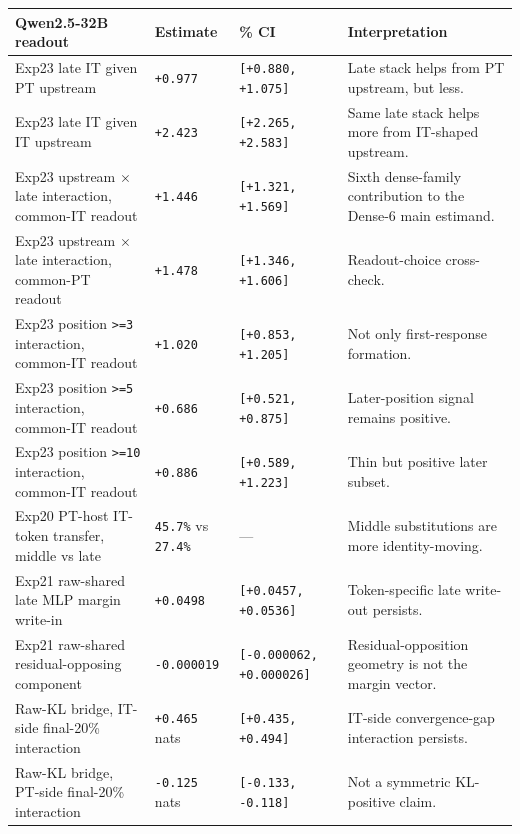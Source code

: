 \documentclass[11pt]{article}
\begin{document}
\begin{table}[t]
\centering
\small
\setlength{\tabcolsep}{3pt}
\begin{tabularx}{\linewidth}{@{}>{\raggedright\arraybackslash}X >{\raggedright\arraybackslash}X >{\raggedright\arraybackslash}X >{\raggedright\arraybackslash}X@{}}
\toprule
Qwen2.5-32B readout & Estimate & 95\% CI & Interpretation \\
\midrule
Exp23 late IT given PT upstream & \texttt{+0.977} & \texttt{[+0.880, +1.075]} & Late stack helps from PT upstream, but less. \\
Exp23 late IT given IT upstream & \texttt{+2.423} & \texttt{[+2.265, +2.583]} & Same late stack helps more from IT-shaped upstream. \\
Exp23 upstream \ensuremath{\times} late interaction, common-IT readout & \texttt{+1.446} & \texttt{[+1.321, +1.569]} & Sixth dense-family contribution to the Dense-6 main estimand. \\
Exp23 upstream \ensuremath{\times} late interaction, common-PT readout & \texttt{+1.478} & \texttt{[+1.346, +1.606]} & Readout-choice cross-check. \\
Exp23 position \texttt{>=3} interaction, common-IT readout & \texttt{+1.020} & \texttt{[+0.853, +1.205]} & Not only first-response formation. \\
Exp23 position \texttt{>=5} interaction, common-IT readout & \texttt{+0.686} & \texttt{[+0.521, +0.875]} & Later-position signal remains positive. \\
Exp23 position \texttt{>=10} interaction, common-IT readout & \texttt{+0.886} & \texttt{[+0.589, +1.223]} & Thin but positive later subset. \\
Exp20 PT-host IT-token transfer, middle vs late & \texttt{45.7\%} vs \texttt{27.4\%} & --- & Middle substitutions are more identity-moving. \\
Exp21 raw-shared late MLP margin write-in & \texttt{+0.0498} & \texttt{[+0.0457, +0.0536]} & Token-specific late write-out persists. \\
Exp21 raw-shared residual-opposing component & \texttt{-0.000019} & \texttt{[-0.000062, +0.000026]} & Residual-opposition geometry is not the margin vector. \\
Raw-KL bridge, IT-side final-20\% interaction & \texttt{+0.465} nats & \texttt{[+0.435, +0.494]} & IT-side convergence-gap interaction persists. \\
Raw-KL bridge, PT-side final-20\% interaction & \texttt{-0.125} nats & \texttt{[-0.133, -0.118]} & Not a symmetric KL-positive claim. \\
\bottomrule
\end{tabularx}
\end{table}
\end{document}
